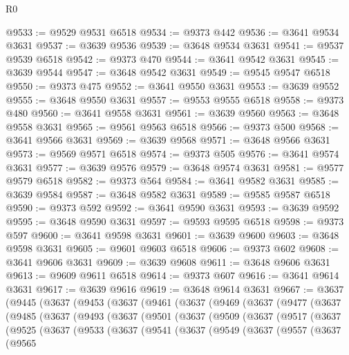 \begin{lexlean}{R0}
\begin{coremodule}
@9533 := @9529 @9531 @6518
@9534 := @9373 @442
@9536 := @3641 @9534 @3631
@9537 := @3639 @9536
@9539 := @3648 @9534 @3631
@9541 := @9537 @9539 @6518
@9542 := @9373 @470
@9544 := @3641 @9542 @3631
@9545 := @3639 @9544
@9547 := @3648 @9542 @3631
@9549 := @9545 @9547 @6518
@9550 := @9373 @475
@9552 := @3641 @9550 @3631
@9553 := @3639 @9552
@9555 := @3648 @9550 @3631
@9557 := @9553 @9555 @6518
@9558 := @9373 @480
@9560 := @3641 @9558 @3631
@9561 := @3639 @9560
@9563 := @3648 @9558 @3631
@9565 := @9561 @9563 @6518
@9566 := @9373 @500
@9568 := @3641 @9566 @3631
@9569 := @3639 @9568
@9571 := @3648 @9566 @3631
@9573 := @9569 @9571 @6518
@9574 := @9373 @505
@9576 := @3641 @9574 @3631
@9577 := @3639 @9576
@9579 := @3648 @9574 @3631
@9581 := @9577 @9579 @6518
@9582 := @9373 @564
@9584 := @3641 @9582 @3631
@9585 := @3639 @9584
@9587 := @3648 @9582 @3631
@9589 := @9585 @9587 @6518
@9590 := @9373 @592
@9592 := @3641 @9590 @3631
@9593 := @3639 @9592
@9595 := @3648 @9590 @3631
@9597 := @9593 @9595 @6518
@9598 := @9373 @597
@9600 := @3641 @9598 @3631
@9601 := @3639 @9600
@9603 := @3648 @9598 @3631
@9605 := @9601 @9603 @6518
@9606 := @9373 @602
@9608 := @3641 @9606 @3631
@9609 := @3639 @9608
@9611 := @3648 @9606 @3631
@9613 := @9609 @9611 @6518
@9614 := @9373 @607
@9616 := @3641 @9614 @3631
@9617 := @3639 @9616
@9619 := @3648 @9614 @3631
@9667 := @3637
    (@9445
      (@3637
        (@9453
          (@3637
            (@9461
              (@3637
                (@9469
                  (@3637
                    (@9477
                      (@3637
                        (@9485
                          (@3637
                            (@9493
                              (@3637
                                (@9501
                                  (@3637
                                    (@9509
                                      (@3637
                                        (@9517
                                          (@3637
                                            (@9525
                                              (@3637
                                                (@9533
                                                  (@3637
                                                    (@9541
                                                      (@3637
                                                        (@9549
                                                          (@3637
                                                            (@9557
                                                              (@3637
                                                                (@9565

\end{coremodule}
\end{lexlean}
